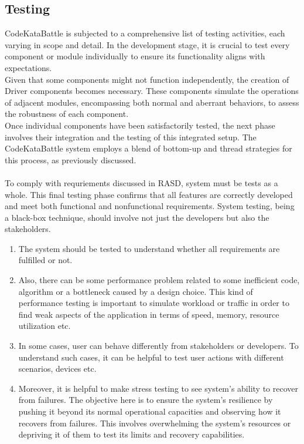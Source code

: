 \newpage
\subsection{Testing}
\indent CodeKataBattle is subjected to a comprehensive list of testing activities, each varying in scope and detail. In the development stage, it is crucial to test every component or module individually to ensure its functionality aligns with expectations. 
\\
\indent Given that some components might not function independently, the creation of Driver components becomes necessary. These components simulate the operations of adjacent modules, encompassing both normal and aberrant behaviors, to assess the robustness of each component.
\\
\indent Once individual components have been satisfactorily tested, the next phase involves their integration and the testing of this integrated setup. The CodeKataBattle system employs a blend of bottom-up and thread strategies for this process, as previously discussed. 
\\
\\ To comply with requriements discussed in RASD, system must be tests as a whole. This final testing phase confirms that all features are correctly developed and meet both functional and nonfunctional requirements. System testing, being a black-box technique, should involve not just the developers but also the stakeholders.

\begin{enumerate}
    \item The system should be tested to understand whether all requirements are fulfilled or not. 
    \item Also, there can be some performance problem related to some inefficient code, algorithm or a bottleneck caused by a design choice. This kind of performance testing is important to simulate workload or traffic in order to find weak aspects of the application in terms of speed, memory, resource utilization etc.
    \item In some cases, user can behave differently from stakeholders or developers. To understand such cases, it can be helpful to test user actions with different scenarios, devices etc. 
    \item Moreover, it is helpful to make stress testing to see system's ability to recover from failures. The objective here is to ensure the system's resilience by pushing it beyond its normal operational capacities and observing how it recovers from failures. This involves overwhelming the system's resources or depriving it of them to test its limits and recovery capabilities.
\end{enumerate}

